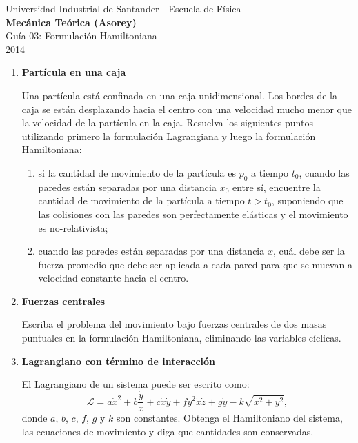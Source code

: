 \documentclass[a4paper,12pt]{article}
\begin{document}
\begin{center}
  {\small{Universidad Industrial de Santander - Escuela de Física}}\\
  {\bf{Mecánica Teórica (Asorey)}}\\
  \vspace{0.4cm}
  Guía 03: Formulación Hamiltoniana\\ 2014
\end{center}
\renewcommand{\labelenumi}{\arabic{enumi})}
\renewcommand{\labelenumii}{\arabic{enumii})}

\begin{enumerate}
  \item {\bf{Partícula en una caja}}

    Una partícula está confinada en una caja unidimensional. Los bordes de la
    caja se están desplazando hacia el centro con una velocidad mucho menor que
    la velocidad de la partícula en la caja. Resuelva los siguientes puntos
    utilizando primero la formulación Lagrangiana y luego la formulación
    Hamiltoniana:
    \begin{enumerate} 
      \item si la cantidad de movimiento de la partícula es $p_0$ a tiempo
        $t_0$, cuando las paredes están separadas por una distancia $x_0$ entre
        sí, encuentre la cantidad de movimiento de la partícula a tiempo
        $t>t_0$, suponiendo que las colisiones con las paredes son
        perfectamente elásticas y el movimiento es no-relativista;
      \item cuando las paredes están separadas por una distancia $x$, cuál debe
        ser la fuerza promedio que debe ser aplicada a cada pared para que se
        muevan a velocidad constante hacia el centro.
    \end{enumerate}

  \item {\bf{Fuerzas centrales}}

    Escriba el problema del movimiento bajo fuerzas centrales de dos masas
    puntuales en la formulación Hamiltoniana, eliminando las variables
    cíclicas.

  \item {\bf{Lagrangiano con término de interacción}}

    El Lagrangiano de un sistema puede ser escrito como: 
    \[ \mathcal{L} = a \dot x^2 + b \frac{\dot y}{x} + c \dot x \dot y + f y^2
    \dot x \dot z + g \dot y - k \sqrt{x^2 + y^2}, \]
    donde $a$, $b$, $c$, $f$, $g$ y $k$ son constantes. Obtenga el Hamiltoniano
    del sistema, las ecuaciones de movimiento y diga que cantidades son
    conservadas. 


\end{enumerate}
\end{document}

